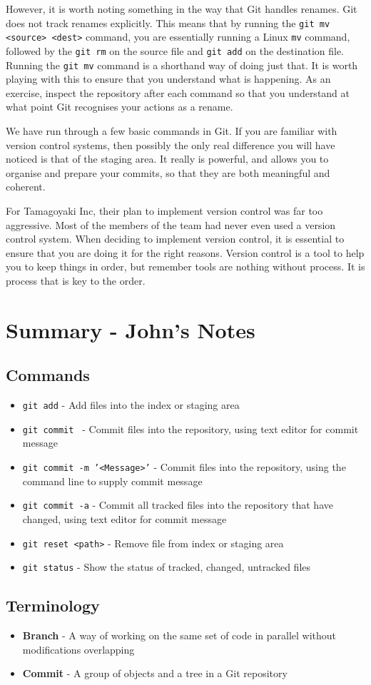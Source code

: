 However, it is worth noting something in the way that Git handles renames.  Git does not track renames explicitly.  This means that by running the \texttt{git mv <source> <dest>} command, you are essentially running a Linux \texttt{mv} command, followed by the \texttt{git rm} on the source file and \texttt{git add} on the destination file.  Running the \texttt{git mv} command is a shorthand way of doing just that.  It is worth playing with this to ensure that you understand what is happening.  As an exercise, inspect the repository after each command so that you understand at what point Git recognises your actions as a rename.

We have run through a few basic commands in Git.  If you are familiar with version control systems, then possibly the only real difference you will have noticed is that of the staging area.  It really is powerful, and allows you to organise and prepare your commits, so that they are both meaningful and coherent.

For Tamagoyaki Inc, their plan to implement version control was far too aggressive.  Most of the members of the team had never even used a version control system.  When deciding to implement version control, it is essential to ensure that you are doing it for the right reasons.  Version control is a tool to help you to keep things in order, but remember tools are nothing without process.  It is process that is key to the order.


\clearpage
\section{Summary - John's Notes}
\subsection{Commands}
\begin{itemize}
\item\texttt{git add} - Add files into the index or staging area

\item\texttt{git commit } - Commit files into the repository, using text editor for commit message

\item\texttt{git commit -m '<Message>'} - Commit files into the repository, using the command line to supply commit message

\item\texttt{git commit -a} - Commit all tracked files into the repository that have changed, using text editor for commit message

\item\texttt{git reset <path>} - Remove file from index or staging area

\item\texttt{git status} - Show the status of tracked, changed, untracked files
\end{itemize}

\subsection{Terminology}
\begin{itemize}
\item\textbf{Branch} - A way of working on the same set of code in parallel without modifications overlapping

\item\textbf{Commit} - A group of objects and a tree in a Git repository
\end{itemize}
